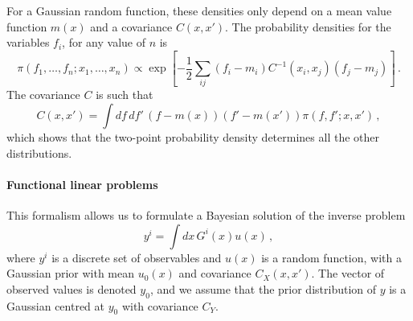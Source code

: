 For a Gaussian random function, these densities only depend on a mean value
function $m(x)$ and a covariance $C(x,x')$. The probability densities for the
variables $f_i$, for any value of $n$ is 
\begin{equation}
  \label{eq:GaussianFunctC}
  \pi\left(f_1, \ldots, f_n; x_1, \ldots, x_n\right)
  \propto \exp \left[ 
      -\frac12 \sum_{ij} \left(f_i - m_i\right) C^{-1}(x_i,x_j) \left(f_j - m_j\right)
    \right]\, .
\end{equation} 
The covariance $C$ is such that
\begin{equation}
  \label{eq:CovFunctInt}
  C(x,x') = \int df\, df'\, \left(f - m(x)\right) \left(f'-m(x')\right)
    \pi\left(f,f';x,x'\right)\,,
\end{equation}
which shows that the two-point probability density determines all the other
distributions. 

\paragraph{Functional linear problems} This formalism allows us to formulate a
Bayesian solution of the inverse problem 
\begin{equation}
  \label{eq:BayesLinearInverse}
  y^i = \int dx\, G^i(x) u(x)\, ,
\end{equation}
where $y^i$ is a discrete set of observables and $u(x)$ is a random function,
with a Gaussian prior with mean $u_0(x)$ and covariance $C_{X}(x,x')$. The
vector of observed values is denoted $y_0$, and we assume that the prior
distribution of $y$ is a Gaussian centred at $y_0$ with covariance $C_{Y}$.

